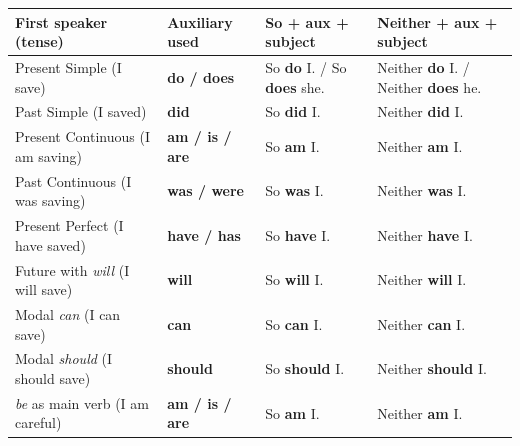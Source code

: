 \documentclass[11pt]{article}
\begin{document}
\begin{center}
\begin{tabularx}{\linewidth}{|l|X|X|X|}\hline
\textbf{First speaker (tense)} & \textbf{Auxiliary used} & \textbf{So + aux + subject} & \textbf{Neither + aux + subject} \\ \hline
Present Simple (I save) & \textbf{do / does} & So \textbf{do} I. / So \textbf{does} she. & Neither \textbf{do} I. / Neither \textbf{does} he. \\ \hline
Past Simple (I saved) & \textbf{did} & So \textbf{did} I. & Neither \textbf{did} I. \\ \hline
Present Continuous (I am saving) & \textbf{am / is / are} & So \textbf{am} I. & Neither \textbf{am} I. \\ \hline
Past Continuous (I was saving) & \textbf{was / were} & So \textbf{was} I. & Neither \textbf{was} I. \\ \hline
Present Perfect (I have saved) & \textbf{have / has} & So \textbf{have} I. & Neither \textbf{have} I. \\ \hline
Future with \emph{will} (I will save) & \textbf{will} & So \textbf{will} I. & Neither \textbf{will} I. \\ \hline
Modal \emph{can} (I can save) & \textbf{can} & So \textbf{can} I. & Neither \textbf{can} I. \\ \hline
Modal \emph{should} (I should save) & \textbf{should} & So \textbf{should} I. & Neither \textbf{should} I. \\ \hline
\emph{be} as main verb (I am careful) & \textbf{am / is / are} & So \textbf{am} I. & Neither \textbf{am} I. \\ \hline
\end{tabularx}
\end{center}
\end{document}
